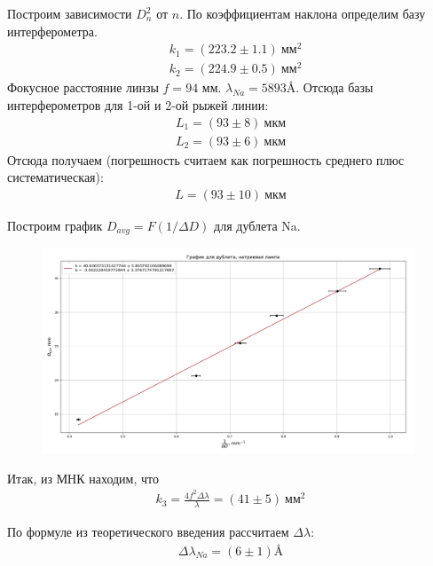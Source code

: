 \documentclass[a4paper,12pt]{article}
\theoremstyle{definition}
\begin{document}
Построим зависимости $D_{n}^{2}$ от $n$. По коэффициентам наклона определим базу интерферометра.
\begin{align*}
  &k_1 = (223.2 \pm 1.1)\ \text{мм}^{2} \\
  &k_2 = (224.9 \pm 0.5)\ \text{мм}^{2} 
\end{align*}
Фокусное расстояние линзы $f = 94$ мм. $\lambda_{Na} = 5893 \text{\AA}$. Отсюда базы интерферометров для 1-ой и 2-ой рыжей линии:
\begin{align*}
    L_1 = (93 \pm 8) \ \text{мкм}
\end{align*}
\begin{align*}
    L_2 = (93 \pm 6) \ \text{мкм}
\end{align*}
Отсюда получаем (погрешность считаем как погрешность среднего плюс систематическая): 
\begin{align*}
L = (93 \pm 10) \ \text{мкм}
\end{align*}

Построим график ${D_{avg}} = F(1/\Delta D)$ для дублета Na. 
\begin{figure}[htbp]
  \centerline{\includegraphics[width=0.99\textwidth]{natgr3.png}}
\end{figure}

Итак, из МНК находим, что
\begin{align*}
    k_3 = \frac{4f^2 \Delta \lambda}{\lambda} = (41 \pm 5)\ \text{мм}^{2}
\end{align*}

\par По формуле из теоретического введения рассчитаем $\Delta \lambda$:
\begin{align*}
    \Delta \lambda_{Na} = (6 \pm 1) \text{\AA}
\end{align*}

\newpage 
\end{document}

